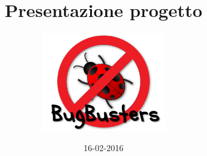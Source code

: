 \documentclass[]{beamer}
\title{Presentazione progetto}
\author[BugBuster]{\includegraphics[width=0.4\textwidth]{logo.png}}
\date{16-02-2016}
\institute{Progetto MaaS}
\begin{document}
\graphicspath{ {res/img/} }



\end{document}
